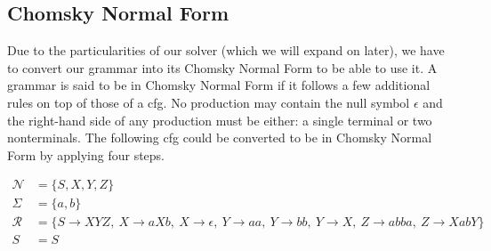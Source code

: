 \documentclass[../Document.tex]{subfiles}
\begin{document}
\subsection{Chomsky Normal Form}
Due to the particularities of our solver (which we will expand on later), we have to convert our grammar into its Chomsky Normal Form to be able to use it.
A grammar is said to be in Chomsky Normal Form if it follows a few additional rules on top of those of a \gls{cfg}. No production may contain the null symbol $\epsilon$ and the right-hand side of any production must be either: a single terminal or two nonterminals. The following \gls{cfg} could be converted to be in Chomsky Normal Form by applying four steps.

\begin{align*}
    \mathcal{N} &= \{S,X,Y,Z\}\\
    \Sigma &= \{a,b\}\\
    \mathcal{R} &= \{ S \rightarrow XYZ ,\  X \rightarrow aXb ,\  X \rightarrow \epsilon ,\  Y \rightarrow aa ,\   Y \rightarrow bb ,\ Y \rightarrow X ,\ Z \rightarrow abba ,\ Z \rightarrow XabY \}\\
    S &= S\\
\end{align*}
\end{document}
